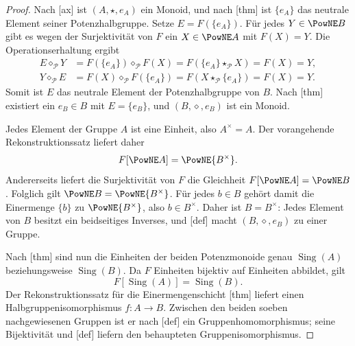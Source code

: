 \documentclass[main.tex]{subfiles}
\begin{document}
\begin{proof}
Nach [ax] ist
\((A,\star,e_A)\) ein Monoid, und nach
[thm] ist \(\{e_A\}\) das neutrale
Element seiner Potenzhalbgruppe.  Setze \(E=F(\{e_A\})\).  Für jedes
\(Y\in\PowNE B\) gibt es wegen der Surjektivität von \(F\) ein
\(X\in\PowNE A\) mit \(F(X)=Y\).  Die Operationserhaltung ergibt
\[
\begin{aligned}
  E\diamond_{\mathcal P}Y
    &=F(\{e_A\})\diamond_{\mathcal P}F(X)
      =F(\{e_A\}\star_{\mathcal P}X)=F(X)=Y,\\
  Y\diamond_{\mathcal P}E
    &=F(X)\diamond_{\mathcal P}F(\{e_A\})
      =F(X\star_{\mathcal P}\{e_A\})=F(X)=Y.
\end{aligned}
\]
Somit ist \(E\) das neutrale Element der Potenzhalbgruppe von \(B\).
Nach
[thm] existiert ein
\(e_B\in B\) mit \(E=\{e_B\}\), und \((B,\diamond,e_B)\) ist ein Monoid.

Jedes Element der Gruppe \(A\) ist eine Einheit, also \(A^\times=A\).
Der vorangehende Rekonstruktionssatz liefert daher
\[
  F[\PowNE A]=\PowNE{B^\times}.
\]
Andererseits liefert die Surjektivität von \(F\) die Gleichheit
\(F[\PowNE A]=\PowNE B\).  Folglich gilt
\(\PowNE B=\PowNE{B^\times}\).  Für jedes \(b\in B\) gehört damit die
Einermenge \(\{b\}\) zu \(\PowNE{B^\times}\), also
\(b\in B^\times\).  Daher ist \(B=B^\times\): Jedes Element von \(B\)
besitzt ein beidseitiges Inverses, und
[def] macht \((B,\diamond,e_B)\) zu einer Gruppe.

Nach [thm] sind nun die
Einheiten der beiden Potenzmonoide genau
\(\operatorname{Sing}(A)\) beziehungsweise \(\operatorname{Sing}(B)\).
Da \(F\) Einheiten bijektiv auf Einheiten abbildet, gilt
\[
  F[\operatorname{Sing}(A)]=\operatorname{Sing}(B).
\]
Der Rekonstruktionssatz für die Einermengenschicht
[thm]
liefert einen Halbgruppenisomorphismus \(f\colon A\to B\).  Zwischen den
beiden soeben nachgewiesenen Gruppen ist er nach
[def] ein Gruppenhomomorphismus; seine
Bijektivität und [def] liefern den behaupteten
Gruppenisomorphismus.
\end{proof}
\end{document}
